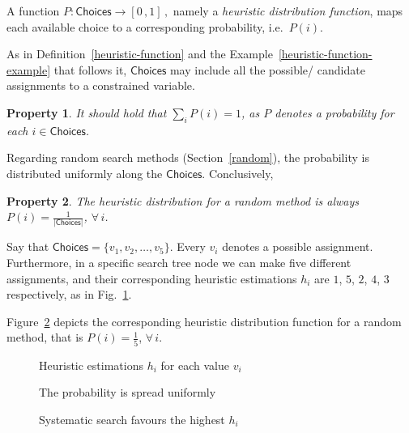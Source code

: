 \documentclass{ws-ijait}
\newtheorem{property}{Property}
\begin{document}
\begin{definition}
  \label{hdf}
  A function $P: \mathsf{Choices} \to [0 \, , 1]\,,$ namely
  a \emph{heuristic distribution function}, maps each
  available choice to a corresponding probability, i.e.\ 
  $P(i)$.
\end{definition}
As in Definition~\ref{heuristic-function} and the
Example~\ref{heuristic-function-example} that follows it,
$\mathsf{Choices}$ may include all the possible\slash
candidate assignments to a constrained variable.
\begin{property}
  It should hold that $\sum_i P(i) = 1$, as $P$ denotes a
  probability for each $i \in \mathsf{Choices}$.
\end{property}
Regarding random search methods (Section~\ref{random}), the
probability is distributed uniformly along the
$\mathsf{Choices}$. Conclusively,
\begin{property}
  \label{probability-random}
  The heuristic distribution for a random method is always
  $P(i) = \frac{1}{|\mathsf{Choices}|}$, $\forall \, i$.
\end{property}
\begin{example}
  \label{distribution}
  Say that $\mathsf{Choices} = \{v_1, v_2, \ldots, v_5\}$.
  Every $v_i$ denotes a possible assignment. Furthermore, in
  a specific search tree node we can make five different
  assignments, and their corresponding heuristic estimations
  $h_i$ are $1$, $5$, $2$, $4$, $3$ respectively, as in
  Fig.~\ref{heuristics}.

  Figure~\ref{uniform} depicts the corresponding heuristic
  distribution function for a random method, that is $P(i) =
  \frac{1}{5}$, $\forall \, i$.
\end{example}

\begin{figure}
  \centering
  
  \caption{Heuristic estimations $h_i$ for each value
           $v_i$\label{heuristics}}
\end{figure}

\begin{figure}
  \centering
  
  \caption{The probability is spread
           uniformly\label{uniform}}
\end{figure}

\begin{figure}
  \centering
  
  \caption{Systematic search favours the highest
           $h_i$\label{systematic}}
\end{figure}
\end{document}
